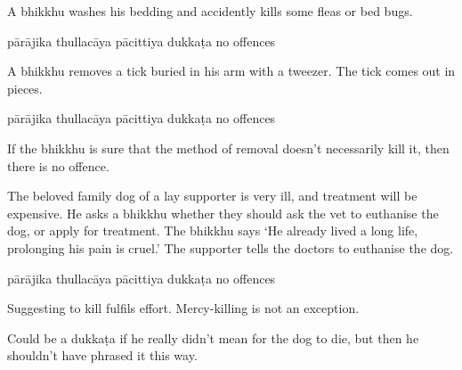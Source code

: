 \begin{exam}{\autoExamName}
\begin{problem*}
\begin{parts}
  \bigskip

  \item A bhikkhu washes his bedding and accidently kills some fleas or bed bugs.

  \bigskip

  \begin{answers}{5}
    \bChoices
     pārājika\eAns
     thullacāya\eAns
     pācittiya\eAns
     dukkaṭa\eAns
     no offences\eAns
    \eChoices
  \end{answers}

  \bigskip

  \item A bhikkhu removes a tick buried in his arm with a tweezer. The tick comes out in pieces.

  \bigskip

  \begin{answers}{5}
    \bChoices
     pārājika\eAns
     thullacāya\eAns
     pācittiya\eAns
     dukkaṭa\eAns
     no offences\eAns
    \eChoices
  \end{answers}

  \begin{solution}
    If the bhikkhu is sure that the method of removal doesn't necessarily kill
    it, then there is no offence.
  \end{solution}

  \bigskip

  \item The beloved family dog of a lay supporter is very ill, and treatment will
    be expensive. He asks a bhikkhu whether they should ask the vet to euthanise
    the dog, or apply for treatment. The bhikkhu says `He already lived a long
    life, prolonging his pain is cruel.' The supporter tells the doctors to
    euthanise the dog.

  \bigskip

  \begin{answers}{5}
    \bChoices
     pārājika\eAns
     thullacāya\eAns
     pācittiya\eAns
     dukkaṭa\eAns
     no offences\eAns
    \eChoices
  \end{answers}

  \begin{solution}
    Suggesting to kill fulfils effort. Mercy-killing is not an exception.

    Could be a dukkaṭa if he really didn't mean for the dog to die, but then he
    shouldn't have phrased it this way.
  \end{solution}


\end{parts}
\end{problem*}
\end{exam}

